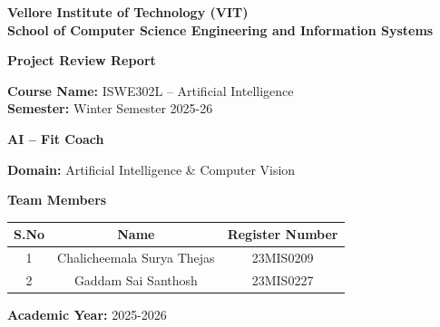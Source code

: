 \documentclass[12pt,a4paper]{article}
\begin{document}

\thispagestyle{empty}
\vspace*{0.5cm}

\begin{center}
  \textbf{\Large Vellore Institute of Technology (VIT)} \\
  \textbf{\large School of Computer Science Engineering and Information Systems} \\
  
  \vspace{2.5cm}
  
  \textbf{\Large Project Review Report} \\
  
  \vspace{2cm}
  
  \textbf{Course Name:} ISWE302L -- Artificial Intelligence \\
  \textbf{Semester:} Winter Semester 2025-26 \\
  
  \vspace{2.5cm}
  
  \textbf{\huge AI -- Fit Coach} \\
  
  \vspace{1.5cm}
  
  \textbf{Domain:} Artificial Intelligence \& Computer Vision \\
  
  \vspace{2.5cm}
  
  \textbf{\Large Team Members} \\
  
  \vspace{1cm}
  
  \begin{tabular}{|c|c|c|}
    \hline
    \textbf{S.No} & \textbf{Name} & \textbf{Register Number} \\
    \hline
    1 & Chalicheemala Surya Thejas & 23MIS0209 \\
    \hline
    2 & Gaddam Sai Santhosh & 23MIS0227 \\
    \hline
  \end{tabular}
  
  \vspace{3cm}
  
  \textbf{Academic Year:} 2025-2026
\end{center}
\end{document}
